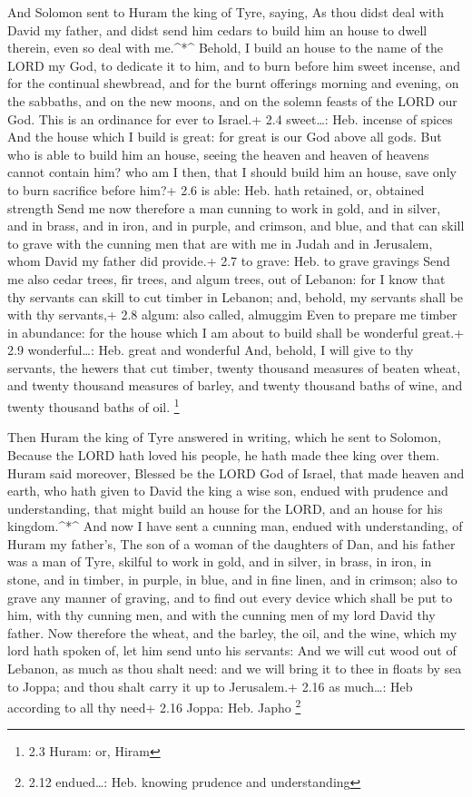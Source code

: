  And Solomon sent to Huram the king of Tyre, saying, As thou
didst deal with David my father, and didst send him cedars to build him
an house to dwell therein, even so deal with me.\^{}*\^{} 
Behold, I build an house to the name of the LORD my God, to dedicate it
to him, and to burn before him sweet incense, and for the continual
shewbread, and for the burnt offerings morning and evening, on the
sabbaths, and on the new moons, and on the solemn feasts of the LORD our
God. This is an ordinance for ever to Israel.+ 2.4 sweet\ldots: Heb.
incense of spices  And the house which I build is great: for
great is our God above all gods.  But who is able to build
him an house, seeing the heaven and heaven of heavens cannot contain
him? who am I then, that I should build him an house, save only to burn
sacrifice before him?+ 2.6 is able: Heb. hath retained, or, obtained
strength  Send me now therefore a man cunning to work in
gold, and in silver, and in brass, and in iron, and in purple, and
crimson, and blue, and that can skill to grave with the cunning men that
are with me in Judah and in Jerusalem, whom David my father did
provide.+ 2.7 to grave: Heb. to grave gravings  Send me also
cedar trees, fir trees, and algum trees, out of Lebanon: for I know that
thy servants can skill to cut timber in Lebanon; and, behold, my
servants shall be with thy servants,+ 2.8 algum: also called, almuggim
 Even to prepare me timber in abundance: for the house which
I am about to build shall be wonderful great.+ 2.9 wonderful\ldots: Heb.
great and wonderful  And, behold, I will give to thy
servants, the hewers that cut timber, twenty thousand measures of beaten
wheat, and twenty thousand measures of barley, and twenty thousand baths
of wine, and twenty thousand baths of oil. \footnote{2.3 Huram: or,
  Hiram}

 Then Huram the king of Tyre answered in writing, which he
sent to Solomon, Because the LORD hath loved his people, he hath made
thee king over them.  Huram said moreover, Blessed be the
LORD God of Israel, that made heaven and earth, who hath given to David
the king a wise son, endued with prudence and understanding, that might
build an house for the LORD, and an house for his kingdom.\^{}*\^{}
 And now I have sent a cunning man, endued with
understanding, of Huram my father's,  The son of a woman of
the daughters of Dan, and his father was a man of Tyre, skilful to work
in gold, and in silver, in brass, in iron, in stone, and in timber, in
purple, in blue, and in fine linen, and in crimson; also to grave any
manner of graving, and to find out every device which shall be put to
him, with thy cunning men, and with the cunning men of my lord David thy
father.  Now therefore the wheat, and the barley, the oil,
and the wine, which my lord hath spoken of, let him send unto his
servants:  And we will cut wood out of Lebanon, as much as
thou shalt need: and we will bring it to thee in floats by sea to Joppa;
and thou shalt carry it up to Jerusalem.+ 2.16 as much\ldots: Heb
according to all thy need+ 2.16 Joppa: Heb. Japho \footnote{2.12
  endued\ldots: Heb. knowing prudence and understanding}

